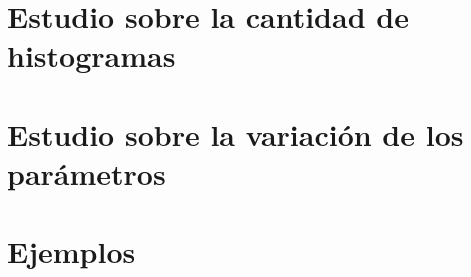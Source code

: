 \documentclass[11pt, spanish]{article}
\begin{document}
\section{Estudio sobre la cantidad de histogramas}

\newpage

\section{Estudio sobre la variación de los parámetros}

\newpage

\section{Ejemplos}

\end{document}
